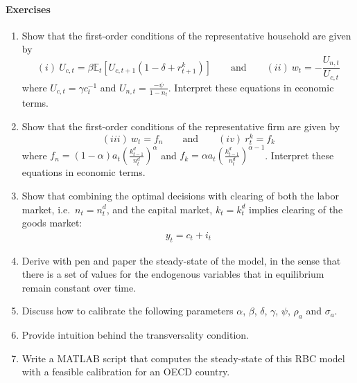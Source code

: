 \paragraph{Exercises}

\begin{enumerate}

\item
Show that the first-order conditions of the representative household are given by
\begin{equation*}
(i)~U_{c,t} = \beta \mathbb{E}_{t}\left[U_{c,t+1} \left(1-\delta + r^{k}_{t+1}\right)\right] \qquad \text{and} \qquad
(ii)~w_t = -\frac{U_{n,t}}{U_{c,t}}
\end{equation*}
where \(U_{c,t} = \gamma c_t^{-1}\) and \(U_{n,t} = \frac{-\psi}{1-n_t}\).
Interpret these equations in economic terms.

\item
Show that the first-order conditions of the representative firm are given by
\begin{equation*}
(iii)~w_t = f_n \qquad \text{and} \qquad
(iv)~r^{k}_{t} = f_k
\end{equation*}
where \(f_n = (1-\alpha) a_t {\left(\frac{k^{d}_{t-1}}{n^{d}_{t}}\right)}^{\alpha}\)
and \(f_k = \alpha a_t {\left(\frac{k^{d}_{t-1}}{n^{d}_{t}}\right)}^{\alpha-1}\).
Interpret these equations in economic terms.

\item
Show that combining the optimal decisions with clearing of both the labor market, i.e.\
  \(n_t = n^{d}_{t}\), and the capital market, \(k_{t} = k^{d}_{t}\) implies clearing of the goods market:
\begin{align*}
y_t = c_t + i_t
\end{align*}

\item
Derive with pen and paper the steady-state of the model,
  in the sense that there is a set of values for the endogenous variables
  that in equilibrium remain constant over time.

\item
Discuss how to calibrate the following parameters \(\alpha \), \(\beta \), \(\delta \), \(\gamma \), \(\psi \), \(\rho_a \) and \(\sigma_a \).

\item
Provide intuition behind the transversality condition.

\item
Write a MATLAB script that computes the steady-state of this RBC model
  with a feasible calibration for an OECD country.


\end{enumerate}
